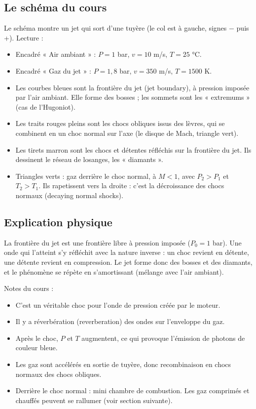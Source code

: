 \documentclass{article}
\begin{document}
\subsection{Le schéma du cours}
Le schéma montre un jet qui sort d'une tuyère (le col est à gauche, signes − puis +). Lecture :
\begin{itemize}
\item Encadré « Air ambiant » : $P = 1$ bar, $v = 10$ m/s, $T = 25$ °C.
\item Encadré « Gaz du jet » : $P = 1,8$ bar, $v = 350$ m/s, $T = 1500$ K.
\item Les courbes bleues sont la frontière du jet (jet boundary), à pression imposée par l'air ambiant. Elle forme des bosses ; les sommets sont les « extremums » (cas de l'Hugoniot).
\item Les traits rouges pleins sont les chocs obliques issus des lèvres, qui se combinent en un choc normal sur l'axe (le disque de Mach, triangle vert).
\item Les tirets marron sont les chocs et détentes réfléchis sur la frontière du jet. Ils dessinent le réseau de losanges, les « diamants ».
\item Triangles verts : gaz derrière le choc normal, à $M < 1$, avec $P_2 > P_1$ et $T_2 > T_1$. Ils rapetissent vers la droite : c'est la décroissance des chocs normaux (decaying normal shocks).
\end{itemize}

\subsection{Explication physique}
La frontière du jet est une frontière libre à pression imposée ($P_0 = 1$ bar). Une onde qui l'atteint s'y réfléchit avec la nature inverse : un choc revient en détente, une détente revient en compression. Le jet forme donc des bosses et des diamants, et le phénomène se répète en s'amortissant (mélange avec l'air ambiant).

Notes du cours :
\begin{itemize}
\item C'est un véritable choc pour l'onde de pression créée par le moteur.
\item Il y a réverbération (reverberation) des ondes sur l'enveloppe du gaz.
\item Après le choc, $P$ et $T$ augmentent, ce qui provoque l'émission de photons de couleur bleue.
\item Les gaz sont accélérés en sortie de tuyère, donc recombinaison en chocs normaux des chocs obliques.
\item Derrière le choc normal : mini chambre de combustion. Les gaz comprimés et chauffés peuvent se rallumer (voir section suivante).
\end{itemize}
\end{document}
